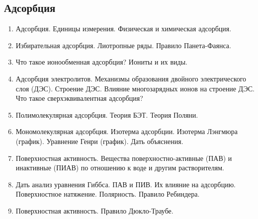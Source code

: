 \subsection{Адсорбция}
\begin{enumerate}
\item 
Адсорбция. Единицы измерения. Физическая и химическая адсорбция.

\item
Избирательная адсорбция. Лиотропные ряды. Правило Панета-Фаянса.

\item
Что такое ионообменная адсорбция? Иониты и их виды.

\item
Адсорбция электролитов. Механизмы образования двойного электрического слоя (ДЭС). Строение ДЭС. Влияние многозарядных ионов на строение ДЭС. Что такое сверхэквивалентная адсорбция?

\item
Полимолекулярная адсорбция. Теория БЭТ. Теория Поляни.

\item
Мономолекулярная адсорбция. Изотерма адсорбции.  Изотерма Лэнгмюра (график). Уравнение Генри (график). Дать объяснения.

\item 
Поверхностная активность. Вещества поверхностно-активные (ПАВ) и инактивные (ПИАВ) по отношению к воде и другим растворителям.

\item
Дать анализ уравнения Гиббса. ПАВ и ПИВ. Их влияние на адсорбцию. Поверхностное натяжение. Полярность. Правило Ребиндера. 

\item 
Поверхностная активность. Правило Дюкло-Траубе.

\end{enumerate}

